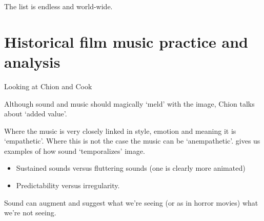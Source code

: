The list is endless and world-wide. 


\section{Historical film music practice and analysis}

Looking at Chion \citeyearpar{chion1990} and Cook \citeyearpar{cook1998analysing}

Although sound and music should magically `meld' with the image, Chion talks about `added value'. 

Where the music is very closely linked in style, emotion and meaning it is `empathetic'. Where this is not the case the music can be `anempathetic'. 
\citep[14-15]{chion1990} gives us examples of how sound `temporalizes' image.
\begin{itemize}
\item Sustained sounds versus fluttering sounds (one is clearly more animated)
\item Predictability versus irregularity. 
\end{itemize}

Sound can augment and suggest what we're seeing (or as in horror movies) what we're not seeing. 

